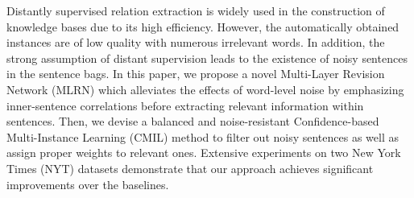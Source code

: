 Distantly supervised relation extraction is widely used in the construction of knowledge bases due to its high efficiency. However, the automatically obtained instances are of low quality with numerous irrelevant words. In addition, the strong assumption of distant supervision leads to the existence of noisy sentences in the sentence bags. In this paper, we propose a novel Multi-Layer Revision Network (MLRN) which alleviates the effects of word-level noise by emphasizing inner-sentence correlations before extracting relevant information within sentences. Then, we devise a balanced and noise-resistant Confidence-based Multi-Instance Learning (CMIL) method to filter out noisy sentences as well as assign proper weights to relevant ones. Extensive experiments on two New York Times (NYT) datasets demonstrate that our approach achieves significant improvements over the baselines.

